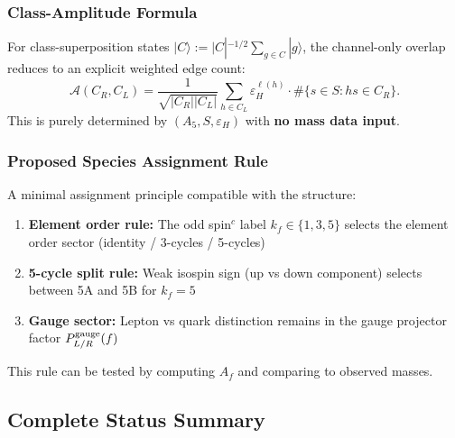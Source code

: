 \subsubsection{Class-Amplitude Formula}

For class-superposition states $|C\rangle := |C|^{-1/2}\sum_{g \in C}|g\rangle$, 
the channel-only overlap reduces to an explicit weighted edge count:
\begin{equation}
\mathcal{A}(C_R, C_L) = \frac{1}{\sqrt{|C_R||C_L|}}
\sum_{h \in C_L} \varepsilon_H^{\ell(h)} \cdot \#\{s \in S : hs \in C_R\}.
\end{equation}
This is purely determined by $(A_5, S, \varepsilon_H)$ with \textbf{no mass data input}.

\subsubsection{Proposed Species Assignment Rule}

A minimal assignment principle compatible with the structure:

\begin{enumerate}
\item \textbf{Element order rule:} The odd spin$^c$ label $k_f \in \{1, 3, 5\}$ 
      selects the element order sector (identity / 3-cycles / 5-cycles)
\item \textbf{5-cycle split rule:} Weak isospin sign (up vs down component) 
      selects between 5A and 5B for $k_f = 5$
\item \textbf{Gauge sector:} Lepton vs quark distinction remains in the gauge 
      projector factor $P^{\rm gauge}_{L/R}(f)$
\end{enumerate}

This rule can be tested by computing $A_f$ and comparing to observed masses.

\subsection{Complete Status Summary}

